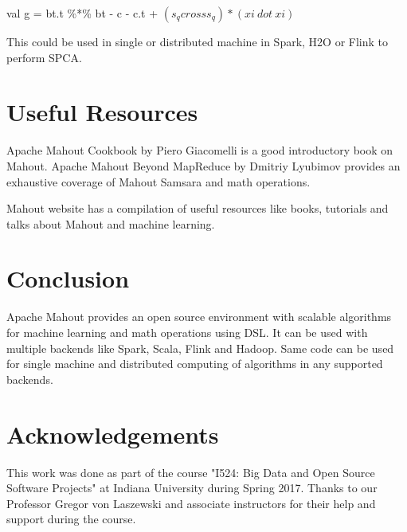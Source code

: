 \documentclass[9pt,twocolumn,twoside]{../../styles/osajnl}
\begin{document}
{val g = bt.t \%*\% bt - c - c.t + $(s_q cross s_q) 
               * (xi \ dot \  xi)$ }



This could be used in single or distributed machine in Spark, H2O or
Flink to perform SPCA.

\section{Useful Resources}
Apache Mahout Cookbook\cite{book-mahout} by Piero Giacomelli is a good
introductory book on Mahout. Apache Mahout\: Beyond
MapReduce\cite{book-samsara} by Dmitriy Lyubimov provides an
exhaustive coverage of Mahout Samsara and math operations.

Mahout website\cite{www-mahoutResources} has a compilation of
useful resources like books, tutorials and talks about Mahout and
machine learning.

\section{Conclusion}
Apache Mahout provides an open source environment with scalable
algorithms for machine learning and math operations using DSL. It can
be used with multiple backends like Spark, Scala, Flink and
Hadoop. Same code can be used for single machine and distributed
computing of algorithms in any supported backends.

\section*{Acknowledgements}

This work was done as part of the course "I524: Big Data and
Open Source Software Projects" at Indiana University during
Spring 2017. Thanks to our Professor Gregor von Laszewski
and associate instructors for their help and support during the
course.




\end{document}
